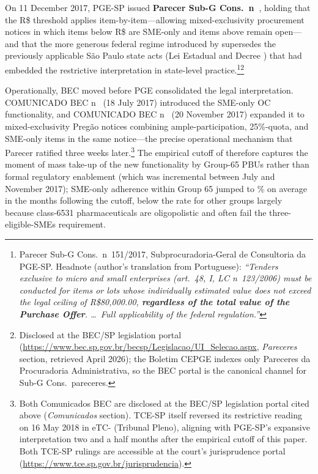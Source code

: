On 11 December 2017, PGE-SP issued \textbf{Parecer Sub-G Cons.\ n\textordmasculine~\pareceNum}, holding that the R\$\setAsideThreshBRL{} threshold applies item-by-item---allowing mixed-exclusivity procurement notices in which items below R\$\setAsideThreshBRL{} are SME-only and items above remain open---and that the more generous federal regime introduced by \LCSetAsideAct{} supersedes the previously applicable São Paulo state acts (Lei Estadual \leiEstadualSp{} and Decree \decreeStatePrev) that had embedded the restrictive interpretation in state-level practice.\footnote{Parecer Sub-G Cons.\ n\textordmasculine~151/2017, Subprocuradoria-Geral de Consultoria da PGE-SP. Headnote (author's translation from Portuguese): \emph{``Tenders exclusive to micro and small enterprises (art.\ 48, I, LC n\textordmasculine~123/2006) must be conducted for items or lots whose individually estimated value does not exceed the legal ceiling of R\$80,000.00, \textbf{regardless of the total value of the Purchase Offer}. \ldots\ Full applicability of the federal regulation.''}}\footnote{Disclosed at the BEC/SP legislation portal (\url{https://www.bec.sp.gov.br/becsp/Legislacao/UI_Selecao.aspx}, \emph{Pareceres} section, retrieved April 2026); the Boletim CEPGE indexes only Pareceres da Procuradoria Administrativa, so the BEC portal is the canonical channel for Sub-G Cons.\ pareceres.}

Operationally, BEC moved before PGE consolidated the legal interpretation. COMUNICADO BEC n\textordmasculine~\comunicadoBECone{} (18 July 2017) introduced the SME-only OC functionality, and COMUNICADO BEC n\textordmasculine~\comunicadoBECtwo{} (20 November 2017) expanded it to mixed-exclusivity Pregão notices combining ample-participation, 25\%-quota, and SME-only items in the same notice---the precise operational mechanism that Parecer \pareceNum{} ratified three weeks later.\footnote{Both Comunicados BEC are disclosed at the BEC/SP legislation portal cited above (\emph{Comunicados} section). TCE-SP itself reversed its restrictive reading on 16 May 2018 in eTC-\eTCExpansive{} (Tribunal Pleno), aligning with PGE-SP's expansive interpretation two and a half months after the empirical cutoff of this paper. Both TCE-SP rulings are accessible at the court's jurisprudence portal (\url{https://www.tce.sp.gov.br/jurisprudencia}).} The empirical cutoff of \policyCutoffMonth{} therefore captures the moment of mass take-up of the new functionality by Group-65 PBUs rather than formal regulatory enablement (which was incremental between July and November 2017); SME-only adherence within Group 65 jumped to \adherenceGsixtyfivePost\% on average in the months following the cutoff, below the rate for other groups largely because class-6531 pharmaceuticals are oligopolistic and often fail the three-eligible-SMEs requirement.

